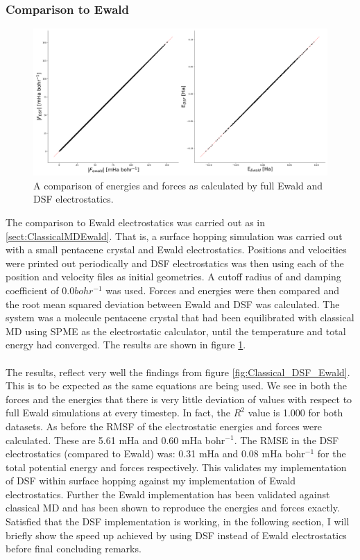\subsubsection{Comparison to Ewald}
\begin{figure}[htp]
  \includegraphics[width=\textwidth]{../img/ES/DSF_vs_Ewald_FSSH.png}
  \caption{\label{fig:DSF_vs_EwaldSH}A comparison of energies and forces as calculated by full Ewald and DSF electrostatics.}
\end{figure}
The comparison to Ewald electrostatics was carried out as in \ref{sect:ClassicalMDEwald}. That is, a surface hopping simulation was carried out with a small pentacene crystal and Ewald electrostatics. Positions and velocities were printed out periodically and DSF electrostatics was then  using each of the position and velocity files as initial geometries. A cutoff radius of  and damping coefficient of 0.0$bohr^{-1}$ was used. Forces and energies were then compared and the root mean squared deviation between Ewald and DSF was calculated. The system was a  molecule pentacene crystal that had been equilibrated with classical MD using SPME as the electrostatic calculator, until the temperature and total energy had converged. The results are shown in figure \ref{fig:DSF_vs_EwaldSH}. 
\\\\
The results, reflect very well the findings from figure \ref{fig:Classical_DSF_Ewald}. This is to be expected as the same equations are being used. We see in both the forces and the energies that there is very little deviation of values with respect to full Ewald simulations at every timestep. In fact, the $R^2$ value is 1.000 for both datasets. As before the RMSF of the electrostatic energies and forces were calculated. These are 5.61 mHa and 0.60 mHa bohr$^{-1}$. The RMSE in the DSF electrostatics (compared to Ewald) was: 0.31 mHa and 0.08 mHa bohr$^{-1}$ for the total potential energy and forces respectively. This validates my implementation of DSF within surface hopping against my implementation of Ewald electrostatics. Further the Ewald implementation has been validated against classical MD and has been shown to reproduce the energies and forces exactly. Satisfied that the DSF implementation is working, in the following section, I will briefly show the speed up achieved by using DSF instead of Ewald electrostatics before final concluding remarks.

